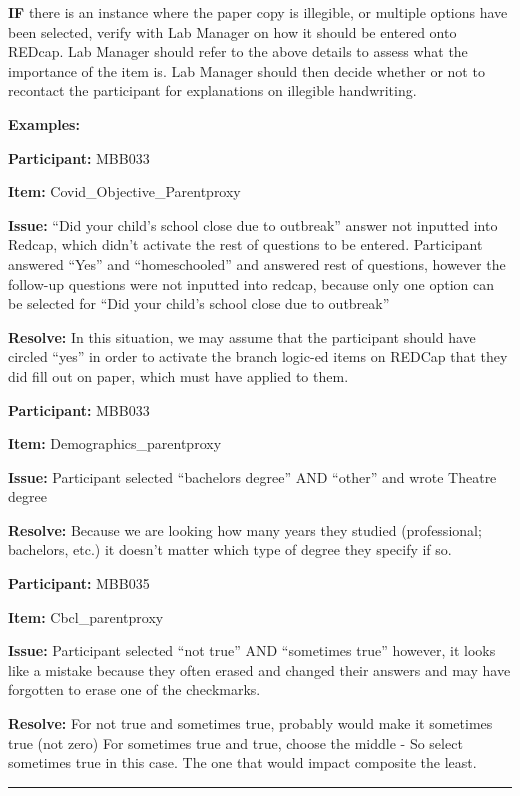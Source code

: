 \documentclass[
]{book}
\begin{document}
\textbf{IF} there is an instance where the paper copy is illegible, or multiple options have been selected, verify with Lab Manager on how it should be entered onto REDcap. Lab Manager should refer to the above details to assess what the importance of the item is. Lab Manager should then decide whether or not to recontact the participant for explanations on illegible handwriting.

\textbf{Examples:}

\textbf{Participant:} MBB033

\textbf{Item:} Covid\_Objective\_Parentproxy

\textbf{Issue:} ``Did your child's school close due to outbreak'' answer not inputted into Redcap, which didn't activate the rest of questions to be entered. Participant answered ``Yes'' and ``homeschooled'' and answered rest of questions, however the follow-up questions were not inputted into redcap, because only one option can be selected for ``Did your child's school close due to outbreak''

\textbf{Resolve:} In this situation, we may assume that the participant should have circled ``yes'' in order to activate the branch logic-ed items on REDCap that they did fill out on paper, which must have applied to them.

\textbf{Participant:} MBB033

\textbf{Item:} Demographics\_parentproxy

\textbf{Issue:} Participant selected ``bachelors degree'' AND ``other'' and wrote Theatre degree

\textbf{Resolve:} Because we are looking how many years they studied (professional; bachelors, etc.) it doesn't matter which type of degree they specify if so.

\textbf{Participant:} MBB035

\textbf{Item:} Cbcl\_parentproxy

\textbf{Issue:} Participant selected ``not true'' AND ``sometimes true'' however, it looks like a mistake because they often erased and changed their answers and may have forgotten to erase one of the checkmarks.

\textbf{Resolve:} For not true and sometimes true, probably would make it sometimes true (not zero)
For sometimes true and true, choose the middle - So select sometimes true in this case. The one that would impact composite the least.

\begin{center}\rule{0.5\linewidth}{0.5pt}\end{center}
\end{document}
